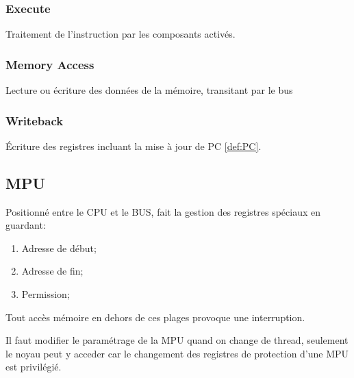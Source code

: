\documentclass{article}
\begin{document}
\subsubsection{Execute}
\begin{definition}\label{def:execute}
    Traitement de l'instruction par les composants activés.
\end{definition}

\subsubsection{Memory Access}
\begin{definition}\label{def:memoryAccess}
    Lecture ou écriture des données de la mémoire, transitant par le bus
\end{definition}

\subsubsection{Writeback}
\begin{definition}\label{def:writeBack}
    Écriture des registres incluant la mise à jour de PC \ref{def:PC}.
\end{definition}


\subsection{MPU}
\begin{definition}\label{def:MPU}
    Positionné entre le CPU et le BUS, fait la gestion des registres spéciaux en guardant:
    \begin{enumerate}[noitemsep]
        \item Adresse de début;
        \item Adresse de fin;
        \item Permission;
    \end{enumerate}
    Tout accès mémoire en dehors de ces plages provoque une interruption.

    \begin{remark}
        Il faut modifier le paramétrage de la MPU quand on change de thread, seulement le noyau peut y acceder car le changement des registres de protection d'une MPU est privilégié.
    \end{remark}
\end{definition}
\end{document}
